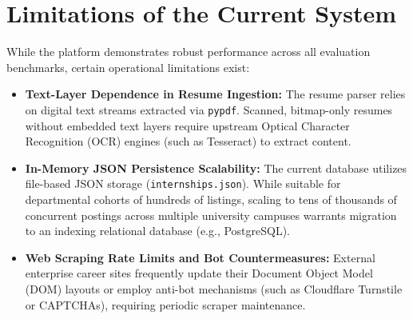 \section{Limitations of the Current System} \label{S7.3}
While the platform demonstrates robust performance across all evaluation benchmarks, certain operational limitations exist:
\begin{itemize}
	\item \textbf{Text-Layer Dependence in Resume Ingestion:} The resume parser relies on digital text streams extracted via \texttt{pypdf}. Scanned, bitmap-only resumes without embedded text layers require upstream Optical Character Recognition (OCR) engines (such as Tesseract) to extract content.
	\item \textbf{In-Memory JSON Persistence Scalability:} The current database utilizes file-based JSON storage (\texttt{internships.json}). While suitable for departmental cohorts of hundreds of listings, scaling to tens of thousands of concurrent postings across multiple university campuses warrants migration to an indexing relational database (e.g., PostgreSQL).
	\item \textbf{Web Scraping Rate Limits and Bot Countermeasures:} External enterprise career sites frequently update their Document Object Model (DOM) layouts or employ anti-bot mechanisms (such as Cloudflare Turnstile or CAPTCHAs), requiring periodic scraper maintenance.
\end{itemize}

